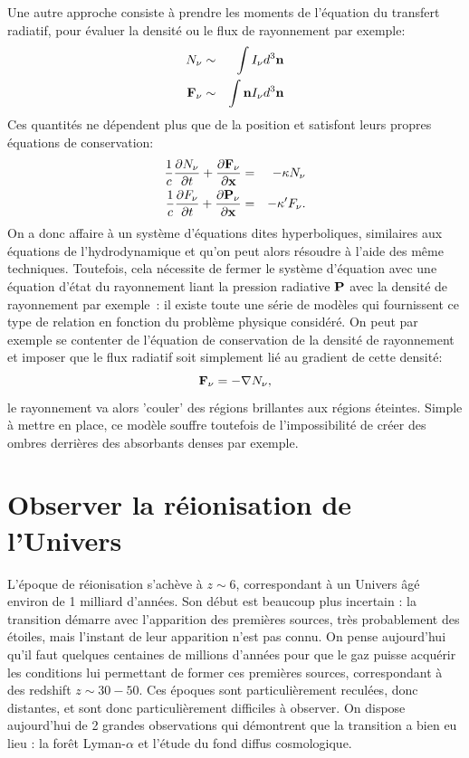 Une autre approche consiste à prendre les moments de l'équation du transfert radiatif, pour évaluer la densité ou le flux de rayonnement par exemple:
\begin{eqnarray}
N_\nu&\sim&\int I_\nu d^3{\bf n}\\
{\bf F}_\nu&\sim&\int {\bf n} I_\nu d^3{\bf n}
\end{eqnarray}
Ces quantités ne dépendent plus que de la position et satisfont leurs propres équations de conservation:
\begin{eqnarray}
\frac{1}{c}\frac{\partial N_\nu}{\partial t}+\frac{\partial {\bf F_\nu}}{\partial {\bf x}}&=&-\kappa N_\nu\\
\frac{1}{c}\frac{\partial F_\nu}{\partial t}+\frac{\partial {\bf P_\nu}}{\partial {\bf x}}&=&-\kappa' F_\nu.
\end{eqnarray}
On a donc affaire à un système d'équations dites hyperboliques, similaires aux équations de l'hydrodynamique et qu'on peut alors résoudre à l'aide des même techniques. Toutefois, cela nécessite de fermer le système d'équation avec une équation d'état du rayonnement liant la pression radiative $\bf P$ avec la densité de rayonnement par exemple~: il existe toute une série de modèles qui fournissent ce type de relation en fonction du problème physique considéré. On peut par exemple se contenter de l'équation de conservation de la densité de rayonnement et imposer que le flux radiatif soit simplement lié au gradient de cette densité:
\begin{equation}
{\bf F_\nu}=-\nabla N_\nu,
\end{equation}
le rayonnement va alors 'couler' des régions brillantes aux régions éteintes. Simple à mettre en place, ce modèle souffre toutefois de l'impossibilité de créer des ombres derrières des absorbants denses par exemple.

\section{Observer la réionisation de l'Univers}
L'époque de réionisation s'achève à $z\sim 6$, correspondant à un Univers âgé environ de 1 milliard d'années. Son début est beaucoup plus incertain : la transition démarre avec l'apparition des premières sources, très probablement des étoiles, mais l'instant de leur apparition n'est pas connu. On pense aujourd'hui qu'il faut quelques centaines de millions d'années pour que le gaz puisse acquérir les conditions lui permettant de former ces premières sources, correspondant à des redshift $z\sim 30- 50$. Ces époques sont particulièrement reculées, donc distantes, et sont donc particulièrement difficiles à observer.  On dispose aujourd'hui de 2 grandes observations qui démontrent que la transition a bien eu lieu : la forêt Lyman-$\alpha$ et l'étude du fond diffus cosmologique.

